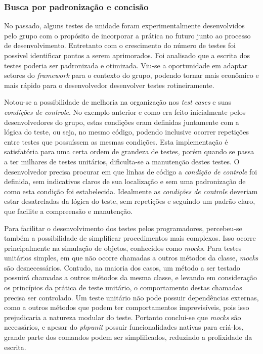 \hypertarget{busca-por-padronizacao-e-concisao}{%
\subsubsection{Busca por padronização e concisão}\label{busca-por-padronizacao-e-concisao}}

No passado, alguns testes de unidade foram experimentalmente desenvolvidos pelo grupo com o propósito de incorporar a prática no futuro junto ao processo de desenvolvimento. Entretanto com o crescimento do número de testes foi possível identificar pontos a serem aprimorados. Foi analisado que a escrita dos testes poderia ser padronizada e otimizada. Viu-se a oportunidade em adaptar setores do \emph{framework} para o contexto do grupo, podendo tornar mais econômico e mais rápido para o desenvolvedor desenvolver testes rotineiramente.

Notou-se a possibilidade de melhoria na organização nos \emph{test cases} e suas \emph{condições de controle}. No exemplo anterior e como era feito inicialmente pelos desenvolvedores do grupo, estas condições eram definidas juntamente com a lógica do teste, ou seja, no mesmo código, podendo inclusive ocorrer repetições entre testes que possuíssem as mesmas condições. Esta implementação é satisfatória para uma certa ordem de grandeza de testes, porém quando se passa a ter milhares de testes unitários, dificulta-se a manutenção destes testes. O desenvolvedor precisa procurar em que linhas de código a \emph{condição de controle} foi definida, sem indicativos claros de sua localização e sem uma padronização de como esta condição foi estabelecida. Idealmente as \emph{condições de controle} deveriam estar desatreladas da lógica do teste, sem repetições e seguindo um padrão claro, que facilite a compreensão e manutenção.

Para facilitar o desenvolvimento dos testes pelos programadores, percebeu-se também a possibilidade de simplificar procedimentos mais complexos. Isso ocorre principalmente na simulação de objetos, conhecidos como \emph{mocks}. Para testes unitários simples, em que não ocorre chamadas a outros métodos da classe, \emph{mocks} são desnecessários. Contudo, na maioria dos casos, um método a ser testado possuirá chamadas a outros métodos da mesma classe, e levando em consideração os princípios da prática de teste unitário, o comportamento destas chamadas precisa ser controlado. Um teste unitário não pode possuir dependências externas, como a outros métodos que podem ter comportamentos imprevisíveis, pois isso prejudicaria a natureza modular do teste. Portanto conclui-se que \emph{mocks} são necessários, e apesar do \emph{phpunit} possuir funcionalidades nativas para criá-los, grande parte dos comandos podem ser simplificados, reduzindo a prolixidade da escrita.

